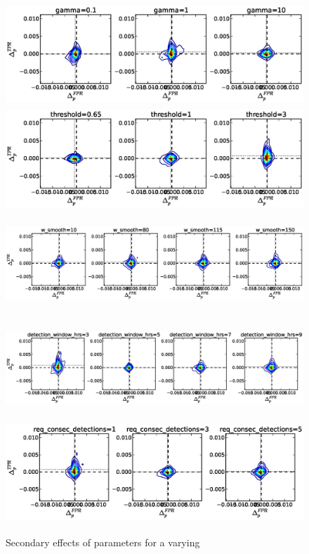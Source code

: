 \begin{figure}[!h]
\begin{center}
\includegraphics[height=1.5in]{../fig/final/delta_hist_sec/cmpr_window/gamma}
\includegraphics[height=1.5in]{../fig/final/delta_hist_sec/cmpr_window/threshold}
\includegraphics[height=1.5in]{../fig/final/delta_hist_sec/cmpr_window/w_smooth}
\includegraphics[height=1.5in]{../fig/final/delta_hist_sec/cmpr_window/detection_window_hrs}
\includegraphics[height=1.5in]{../fig/final/delta_hist_sec/cmpr_window/req_consec_detections}
\end{center}
\caption{\label{fig:delta_sec2} Secondary effects of parameters for a varying }
\end{figure}

